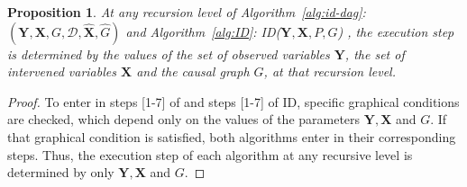 \documentclass{article}
\newcommand{\X}{\mathbf{X}}
\newcommand{\Xp}{{\hat{\mathbf{X}}}}
\newcommand{\Gp}{{\hat{{G}}}}
\newcommand{\Y}{\mathbf{Y}}
\newcommand{\data}{\mathcal{D}}
\newcommand{\idgen}{\text{ID-GEN}\xspace}
\theoremstyle{plain}
\newtheorem{proposition}[theorem]{Proposition}
\theoremstyle{definition}
\theoremstyle{remark}
\begin{document}
\begin{proposition}
	\label{prop:step-decide}
	At any recursion level of Algorithm~\ref{alg:id-dag}: \idgen$(\mathbf{Y}, \mathbf{X},  G, \data, {\Xp}, \Gp )$ and Algorithm~\ref{alg:ID}: ID($\mathbf{Y}, \mathbf{X}, P, G$) , the execution step is determined by the values of the set of observed variables $\Y$,  the set of intervened variables $\X$ and the causal graph $G$, at that recursion level.
\end{proposition}
\begin{proof}
	To enter in steps [1-7] of \idgen and steps [1-7] of ID, specific graphical conditions are checked, which depend only on the values of the parameters $\Y,\X$ and $G$. If that graphical condition is satisfied, both algorithms enter in their corresponding steps. Thus, the execution step of each algorithm at any recursive level is determined by only $\Y,\X$ and $G$.
\end{proof}
\end{document}
